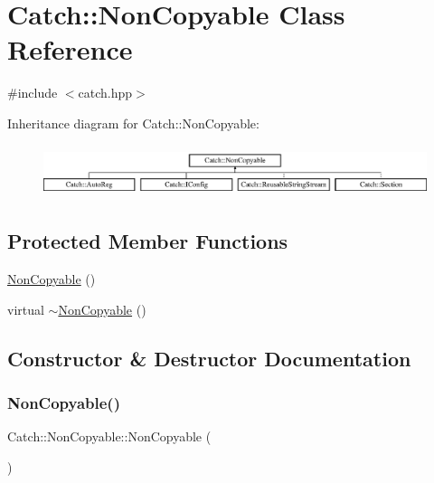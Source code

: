 \hypertarget{class_catch_1_1_non_copyable}{}\section{Catch\+:\+:Non\+Copyable Class Reference}
\label{class_catch_1_1_non_copyable}


{\ttfamily \#include $<$catch.\+hpp$>$}

Inheritance diagram for Catch\+:\+:Non\+Copyable\+:\begin{figure}[H]
\begin{center}
\leavevmode
\includegraphics[height=1.530055cm]{class_catch_1_1_non_copyable}
\end{center}
\end{figure}
\subsection*{Protected Member Functions}
\begin{DoxyCompactItemize}
\item 
\mbox{\hyperlink{class_catch_1_1_non_copyable_a4b492dd5753f9952350fb64dc6cb9fe2}{Non\+Copyable}} ()
\item 
virtual \mbox{\hyperlink{class_catch_1_1_non_copyable_a81254677280fef337eb4a676e91e3293}{$\sim$\+Non\+Copyable}} ()
\end{DoxyCompactItemize}


\subsection{Constructor \& Destructor Documentation}
\mbox{\label{class_catch_1_1_non_copyable_a4b492dd5753f9952350fb64dc6cb9fe2}} 
\subsubsection{\texorpdfstring{Non\+Copyable()}{NonCopyable()}}
{\footnotesize\ttfamily Catch\+::\+Non\+Copyable\+::\+Non\+Copyable (\begin{DoxyParamCaption}{ }\end{DoxyParamCaption})\hspace{0.3cm}{\ttfamily [protected]}}

